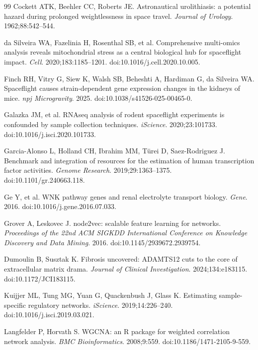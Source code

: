 \documentclass[11pt]{article}
\begin{document}
\begin{thebibliography}{99}
 Cockett ATK, Beehler CC, Roberts JE. Astronautical urolithiasis: a potential hazard during prolonged weightlessness in space travel. \emph{Journal of Urology}. 1962;88:542--544.

 da Silveira WA, Fazelinia H, Rosenthal SB, et al. Comprehensive multi-omics analysis reveals mitochondrial stress as a central biological hub for spaceflight impact. \emph{Cell}. 2020;183:1185--1201. doi:10.1016/j.cell.2020.10.005.

 Finch RH, Vitry G, Siew K, Walsh SB, Beheshti A, Hardiman G, da Silveira WA. Spaceflight causes strain-dependent gene expression changes in the kidneys of mice. \emph{npj Microgravity}. 2025. doi:10.1038/s41526-025-00465-0.

 Galazka JM, et al. RNAseq analysis of rodent spaceflight experiments is confounded by sample collection techniques. \emph{iScience}. 2020;23:101733. doi:10.1016/j.isci.2020.101733.

 Garcia-Alonso L, Holland CH, Ibrahim MM, T\"urei D, Saez-Rodriguez J. Benchmark and integration of resources for the estimation of human transcription factor activities. \emph{Genome Research}. 2019;29:1363--1375. doi:10.1101/gr.240663.118.

 Ge Y, et al. WNK pathway genes and renal electrolyte transport biology. \emph{Gene}. 2016. doi:10.1016/j.gene.2016.07.033.

 Grover A, Leskovec J. node2vec: scalable feature learning for networks. \emph{Proceedings of the 22nd ACM SIGKDD International Conference on Knowledge Discovery and Data Mining}. 2016. doi:10.1145/2939672.2939754.

 Dumoulin B, Susztak K. Fibrosis uncovered: ADAMTS12 cuts to the core of extracellular matrix drama. \emph{Journal of Clinical Investigation}. 2024;134:e183115. doi:10.1172/JCI183115.

 Kuijjer ML, Tung MG, Yuan G, Quackenbush J, Glass K. Estimating sample-specific regulatory networks. \emph{iScience}. 2019;14:226--240. doi:10.1016/j.isci.2019.03.021.

 Langfelder P, Horvath S. WGCNA: an R package for weighted correlation network analysis. \emph{BMC Bioinformatics}. 2008;9:559. doi:10.1186/1471-2105-9-559.


\end{thebibliography}
\end{document}
